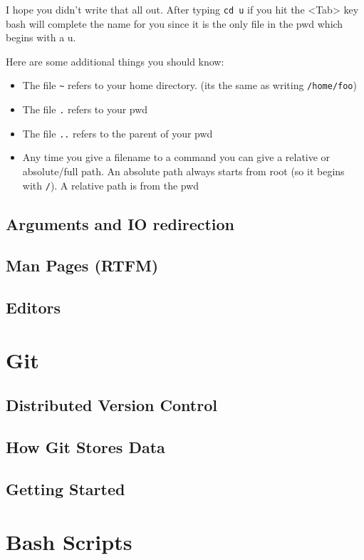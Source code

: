 \documentclass[10pt]{article}
\begin{document}
  I hope you didn't write that all out. After typing \texttt{cd u} if you hit the <Tab> key bash
  will complete the name for you since it is the only file in the pwd which begins with a u.

  Here are some additional things you should know:
  \begin{itemize}
    \item 
      The file \texttt{\~} refers to your home directory. (its the same as writing \texttt{/home/foo})
    \item 
      The file \texttt{.} refers to your pwd
    \item
      The file \texttt{..} refers to the parent of your pwd
    \item
      Any time you give a filename to a command you can give a relative or absolute/full path.
      An absolute path always starts from root (so it begins with \texttt{/}).
      A relative path is from the pwd
  \end{itemize}
  
  \subsection{Arguments and IO redirection} 
  \subsection{Man Pages (RTFM)}
  \subsection{Editors}

\section{Git}

  \subsection{Distributed Version Control}
  \subsection{How Git Stores Data}
  \subsection{Getting Started}
  
\section{Bash Scripts}





\end{document}
